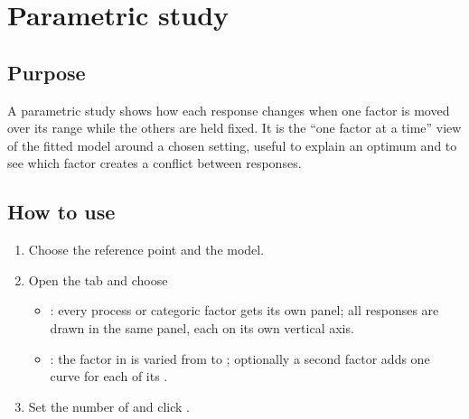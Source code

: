 \section{Parametric study}
\label{sec:ch09-parametric}

\subsection{Purpose}
A parametric study shows how each response changes when one factor is moved over its range while the others are held
fixed. It is the ``one factor at a time'' view of the fitted model around a chosen setting, useful to explain an optimum
and to see which factor creates a conflict between responses.

\subsection{How to use}
\begin{enumerate}
  \item Choose the reference point and the model.
  \item Open the tab  and choose 
        \begin{itemize}
          \item {}: every process or categoric factor gets its own panel; all responses
                are drawn in the same panel, each on its own vertical axis.
          \item {}: the factor in  is varied from  to ;
                optionally  a second factor adds one curve for each of its .
        \end{itemize}
  \item Set the number of  and click .
\end{enumerate}

